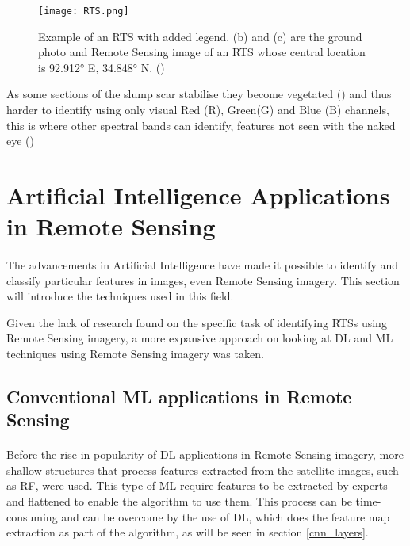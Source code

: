     \begin{figure}[hbt!]
        \centering
        \texttt{[image: RTS.png]}
        \caption{Example of an \gls{RTS} with added legend. (b) and (c) are the
ground photo and Remote Sensing image of an \gls{RTS} whose central location is 92.912° E, 34.848° N. (\cite{HUANG2020111534})}
        \label{fig_RTS}
    \end{figure}


As some sections of the slump scar stabilise they become vegetated (\cite{KOKELJ201556}) and thus harder to identify using only visual Red (R), Green(G) and Blue (B) channels, this is where other spectral bands can identify, features not seen with the naked eye (\cite{HUANG2020111534})
\section{Artificial Intelligence Applications in Remote Sensing}  \label{ai_rs}
\paragraph{}
The advancements in Artificial Intelligence have made it possible to identify and classify particular features in images, even Remote Sensing imagery. This section will introduce the techniques used in this field.

Given the lack of research found on the specific task of identifying \gls{RTS}s using Remote Sensing imagery, a more expansive approach on looking at \gls{DL} and \gls{ML} techniques using Remote Sensing imagery was taken.

\subsection{Conventional \gls{ML} applications in Remote Sensing}  \label{ml_rs}
\paragraph{}
Before the rise in popularity of \gls{DL} applications in Remote Sensing imagery, more shallow structures that process features extracted from the satellite images, such as \gls{RF}, were used. This type of \gls{ML} require features to be extracted by experts and flattened to enable the algorithm to use them. This process can be time-consuming and can be overcome by the use of \gls{DL}, which does the feature map extraction as part of the algorithm, as will be seen in section \ref{cnn_layers}.

